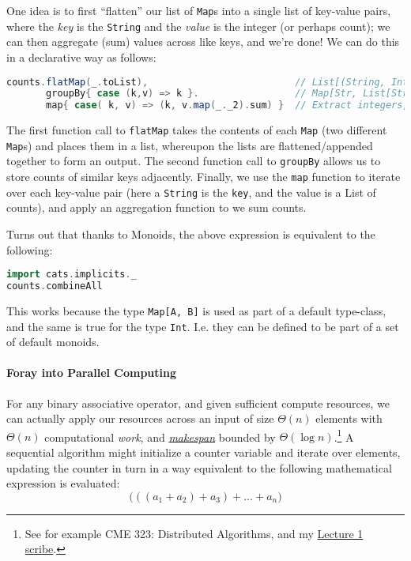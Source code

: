 \documentclass[12pt,letterpaper,twoside]{article}
\begin{document}
One idea is to first ``flatten'' our list of \texttt{Map}s into 
a single list of key-value pairs, where the \emph{key} is the 
\texttt{String} and the \emph{value} is the 
integer (or perhaps count); we can then aggregate (sum) values across like keys,
and we're done! We can do this in a declarative way as follows:
\begin{lstlisting}[language=Scala]
counts.flatMap(_.toList),                          // List[(String, Int)].
       groupBy{ case (k,v) => k }.                 // Map[Str, List[Str,Int]].
       map{ case( k, v) => (k, v.map(_._2).sum) }  // Extract integers, sum. \end{lstlisting}

The first function call to \texttt{flatMap} takes the contents of each
\texttt{Map} (two different \texttt{Map}s) 
and places them in a list, whereupon the lists are flattened/appended
together to form an output. The second function call to \texttt{groupBy}
allows us to store counts of similar keys adjacently. Finally,
we use the \texttt{map} function to iterate over each key-value pair (here
a \texttt{String} is the \texttt{key}, and the value is a 
List of counts), and apply an aggregation function to we sum counts.

Turns out that thanks to Monoids, the above expression is equivalent to the 
following:
{\small
\begin{lstlisting}[language=Scala]
import cats.implicits._
counts.combineAll \end{lstlisting}
}
This works because the type \texttt{Map[A, B]} is used as part of a default
type-class, and the same is true for the type \texttt{Int}. I.e. they
can be defined to be part of a set of default monoids.

\paragraph{Foray into Parallel Computing} For any binary associative operator,
and given sufficient compute resources,
we can actually apply our resources across an input of size $\Theta(n)$ elements
with $\Theta(n)$ computational \emph{work}, and 
\href{https://en.wikipedia.org/wiki/Makespan}{\emph{makespan}} 
bounded by $\Theta(\log n)$.\footnote{
  See for example CME 323: Distributed Algorithms, 
  and my
  \href{https://stanford.edu/~rezab/dao/notes/lecture01/cme323_lec1.pdf}
  {Lecture 1 scribe}.}
A sequential algorithm might initialize a counter
variable and iterate over elements, updating the counter in turn in a way
equivalent to the following mathematical expression is evaluated:
\begin{equation*}   \bigg(\left((a_1 + a_2) + a_3\right) + \ldots + a_n\bigg) \end{equation*}
\end{document}
